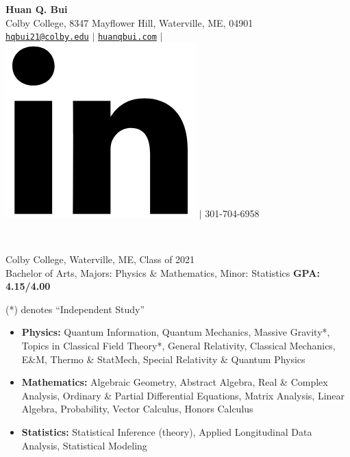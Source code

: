 \documentclass[letter, 11pt]{article}
\newcommand{\longunderline}[1]{\uline{#1\hfill\mbox{}}}
\begin{document}
	\begin{center}
		{\LARGE\textbf{Huan Q. Bui}}\\
		\smallskip
		Colby College, 8347 Mayflower Hill, Waterville, ME, 04901\\ \href{mailto:hqbui21@colby.edu}{\texttt{hqbui21@colby.edu}} $\vert$ \href{https://huanqbui.com}{\texttt{huanqbui.com}} $\vert$ \href{https://www.linkedin.com/in/huan-bui/}{\includegraphics[scale=0.04]{linkedin_logo.PNG}} $\vert$ 301-704-6958
	\end{center}
	\noindent \longunderline{\normalsize{{}}}\\
	\vspace{-7pt}
	
	
			\noindent Colby College, Waterville, ME, Class of 2021\\
			Bachelor of Arts, {Majors}: Physics \& Mathematics, {Minor}: Statistics \hfill \textbf{GPA: 4.15/4.00}\\
			\vspace{-7pt}

			 (*) denotes ``Independent Study''
			\begin{itemize}[noitemsep, nolistsep]
				\item \textbf{Physics:} Quantum Information, Quantum Mechanics, Massive Gravity*, Topics in Classical Field Theory*,  General Relativity, Classical Mechanics, E\&M, Thermo \& StatMech, Special Relativity \& Quantum Physics
				\item \textbf{Mathematics:} Algebraic Geometry, Abstract Algebra, Real \& Complex Analysis, Ordinary \& Partial Differential Equations, Matrix Analysis, Linear Algebra, Probability, Vector Calculus, Honors Calculus
				\item \textbf{Statistics:} Statistical Inference (theory), Applied Longitudinal Data Analysis, Statistical Modeling\\
			\end{itemize}
 
\end{document}
